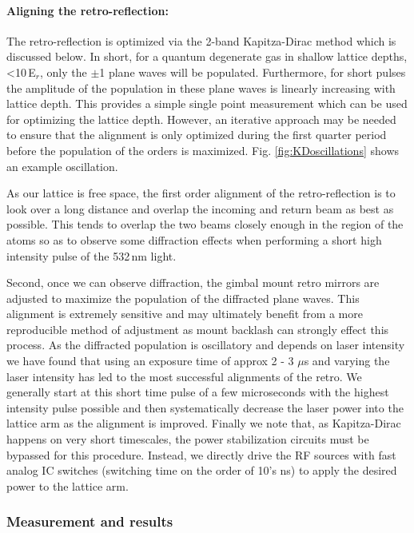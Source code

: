 \paragraph{Aligning the retro-reflection:}
The retro-reflection is optimized via the 2-band Kapitza-Dirac method which is discussed below.
In short, for a quantum degenerate gas in shallow lattice depths, <10\,E$_r$, only the $\pm$1 plane waves will be populated.
Furthermore, for short pulses the amplitude of the population in these plane waves is linearly increasing with lattice depth.
This provides a simple single point measurement which can be used for optimizing the lattice depth.
However, an iterative approach may be needed to ensure that the alignment is only optimized during the first quarter period before the population of the orders is maximized.
Fig. \ref{fig:KDoscillations} shows an example oscillation.

As our lattice is free space, the first order alignment of the retro-reflection is to look over a long distance and overlap the incoming and return beam as best as possible.
This tends to overlap the two beams closely enough in the region of the atoms so as to observe some diffraction effects when performing a short high intensity pulse of the 532\,nm light.

Second, once we can observe diffraction, the gimbal mount retro mirrors are adjusted to maximize the population of the diffracted plane waves.
This alignment is extremely sensitive and may ultimately benefit from a more reproducible method of adjustment as mount backlash can strongly effect this process.
As the diffracted population is oscillatory and depends on laser intensity we have found that using an exposure time of approx 2 - 3 $\mu$s and varying the laser intensity has led to the most successful alignments of the retro.
We generally start at this short time pulse of a few microseconds with the highest intensity pulse possible and then systematically decrease the laser power into the lattice arm as the alignment is improved.
Finally we note that, as Kapitza-Dirac happens on very short timescales, the power stabilization circuits must be bypassed for this procedure.
Instead, we directly drive the RF sources with fast analog IC switches (switching time on the order of 10's ns) to apply the desired power to the lattice arm.

\subsubsection{Measurement and results}

